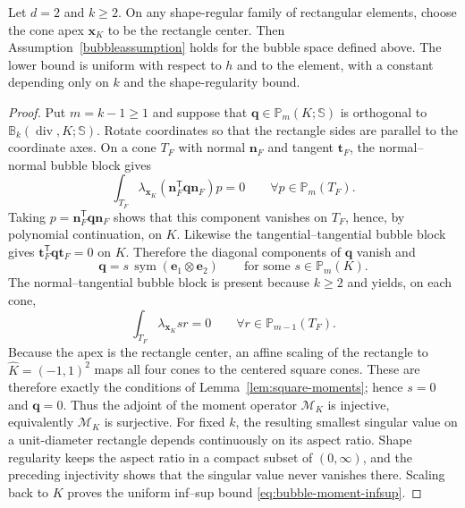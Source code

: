 \documentclass[review,hidelinks,onefignum,onetabnum]{siamart251216}
\renewcommand{\div}{\operatorname{div}}
\newcommand{\sym}{\operatorname{sym}}
\begin{document}
\begin{theorem}\label{thm:bm-rectangles}
Let $d=2$ and $k\ge2$.  On any shape-regular family of rectangular elements,
choose the cone apex $\boldsymbol x_K$ to be the rectangle center.
Then Assumption~\ref{bubbleassumption} holds for the bubble space defined above.
The lower bound is uniform with respect to $h$ and to the element, with a
constant depending only on $k$ and the shape-regularity bound.
\end{theorem}
\begin{proof}
Put $m=k-1\ge1$ and suppose that
$\boldsymbol q\in\mathbb P_m(K;\mathbb S)$ is orthogonal to
$\mathbb B_k(\div,K;\mathbb S)$.  Rotate coordinates so that the rectangle
sides are parallel to the coordinate axes.  On a cone $T_F$ with normal
$\boldsymbol n_F$ and tangent $\boldsymbol t_F$, the normal--normal bubble
block gives
\[
 \int_{T_F}\lambda_{\boldsymbol x_K}
 (\boldsymbol n_F^{\mathsf T}\boldsymbol q\boldsymbol n_F)p=0
 \qquad\forall p\in\mathbb P_m(T_F).
\]
Taking
$p=\boldsymbol n_F^{\mathsf T}\boldsymbol q\boldsymbol n_F$ shows that this
component vanishes on $T_F$, hence, by polynomial continuation, on $K$.
Likewise the tangential--tangential bubble block gives
$\boldsymbol t_F^{\mathsf T}\boldsymbol q\boldsymbol t_F=0$ on $K$.
Therefore the diagonal components of $\boldsymbol q$ vanish and
\[
 \boldsymbol q=s\,\sym(\boldsymbol e_1\otimes\boldsymbol e_2)
 \qquad\text{for some }s\in\mathbb P_m(K).
\]
The normal--tangential bubble block is present because $k\ge2$ and yields,
on each cone,
\[
 \int_{T_F}\lambda_{\boldsymbol x_K}s r=0
 \qquad\forall r\in\mathbb P_{m-1}(T_F).
\]
Because the apex is the rectangle center, an affine scaling
of the rectangle to $\widehat K=(-1,1)^2$ maps all four cones
to the centered square cones. These are therefore exactly the
conditions of Lemma~\ref{lem:square-moments}; hence $s=0$ and
$\boldsymbol q=0$.  Thus the adjoint of the moment operator
$\mathcal M_K$ is injective, equivalently $\mathcal M_K$ is surjective.
For fixed $k$, the resulting smallest singular value on a unit-diameter
rectangle depends continuously on its aspect ratio.  Shape regularity keeps
the aspect ratio in a compact subset of $(0,\infty)$, and the preceding
injectivity shows that the singular value never vanishes there.  Scaling back
to $K$ proves the uniform inf--sup bound
\eqref{eq:bubble-moment-infsup}.
\end{proof}
\end{document}
